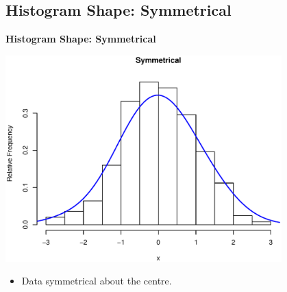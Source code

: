 \documentclass[compress]{beamer}        %
\makeatletter
\newcommand{\tcb}{\textcolor{beamer@blendedblue}}
\makeatother
\begin{document}
\subsection{Histogram Shape: Symmetrical}
\begin{frame}{\bf \tcb{Histogram Shape: Symmetrical}\\[-1.1cm]}
\begin{center}
\includegraphics[width=0.8\textwidth, trim = 0.0cm 0.5cm 0.3cm 1.5cm, clip]{Symmetrical}
\end{center}
\begin{itemize}
\item Data symmetrical about the centre.
\end{itemize}
\end{frame}
\end{document}
